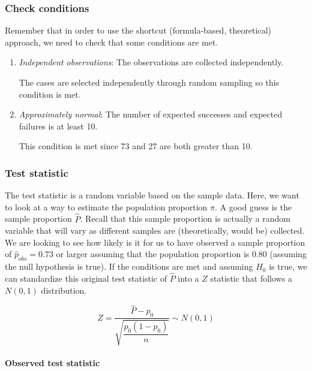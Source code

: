 \documentclass[12pt, krantz2,]{krantz}
\let\oldparagraph\paragraph
\renewcommand{\paragraph}[1]{\oldparagraph{#1}\mbox{}}
\begin{document}
\hypertarget{check-conditions-1}{%
\subsubsection*{Check conditions}\label{check-conditions-1}}


Remember that in order to use the shortcut (formula-based, theoretical) approach, we need to check that some conditions are met.

\begin{enumerate}
\def\labelenumi{\arabic{enumi}.}
\item
  \emph{Independent observations}: The observations are collected independently.

  The cases are selected independently through random sampling so this condition is met.
\item
  \emph{Approximately normal}: The number of expected successes and expected failures is at least 10.

  This condition is met since 73 and 27 are both greater than 10.
\end{enumerate}

\hypertarget{test-statistic-1}{%
\subsubsection*{Test statistic}\label{test-statistic-1}}


The test statistic is a random variable based on the sample data. Here, we want to look at a way to estimate the population proportion \(\pi\). A good guess is the sample proportion \(\hat{P}\). Recall that this sample proportion is actually a random variable that will vary as different samples are (theoretically, would be) collected. We are looking to see how likely is it for us to have observed a sample proportion of \(\hat{p}_{obs} = 0.73\) or larger assuming that the population proportion is 0.80 (assuming the null hypothesis is true). If the conditions are met and assuming \(H_0\) is true, we can standardize this original test statistic of \(\hat{P}\) into a \(Z\) statistic that follows a \(N(0, 1)\) distribution.

\[ Z =\dfrac{ \hat{P} - p_0}{\sqrt{\dfrac{p_0(1 - p_0)}{n} }} \sim N(0, 1) \]

\hypertarget{observed-test-statistic-1}{%
\paragraph{Observed test statistic}\label{observed-test-statistic-1}}
\end{document}
